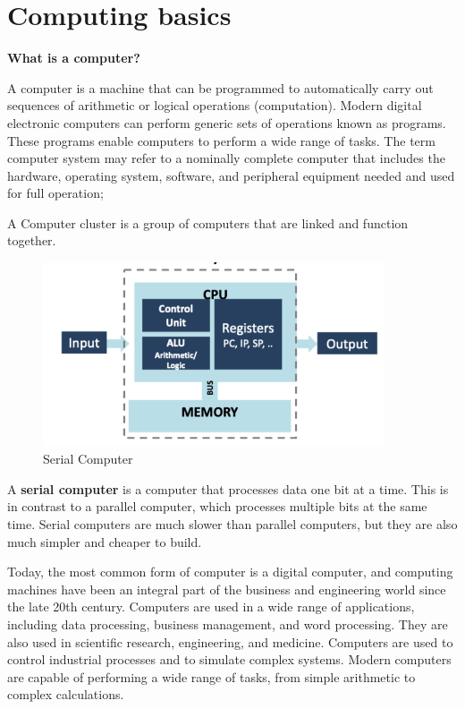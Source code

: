 
\chapter{Computing basics}

\textbf{What is a computer?}

A computer is a machine that can be programmed to automatically carry
out sequences of arithmetic or logical operations (computation). Modern digital
electronic computers can perform generic sets of operations known
as programs. These programs enable computers to perform a wide range of
tasks. The term computer system may refer to a nominally complete computer
that includes the hardware, operating system, software,
and peripheral equipment needed and used for full operation;

A Computer cluster is a group of computers that are linked and function
together.

\begin{minipage}[t]{0.45\textwidth}
    \begin{figure}[H]
        \centering
        \includegraphics[width=0.9\textwidth]{assets/fig16.png}
        \caption{Serial Computer}
    \end{figure}
\end{minipage}
\begin{minipage}[t]{0.45\textwidth}
    \vspace{0.5cm}
    A \textbf{serial computer} is a computer that processes data one bit at a time. This is in contrast to a parallel computer, which processes multiple bits at the same time. Serial computers are much slower than parallel computers, but they are also much simpler and cheaper to build.
\end{minipage}

Today, the most common form of computer is a digital computer, and computing
machines have been an integral part of the business and engineering
world since the late 20th century. Computers are used in a wide range of
applications, including data processing, business management, and word
processing. They are also used in scientific research, engineering, and
medicine. Computers are used to control industrial processes and to
simulate complex systems. Modern computers are capable of performing
a wide range of tasks, from simple arithmetic to complex calculations.

